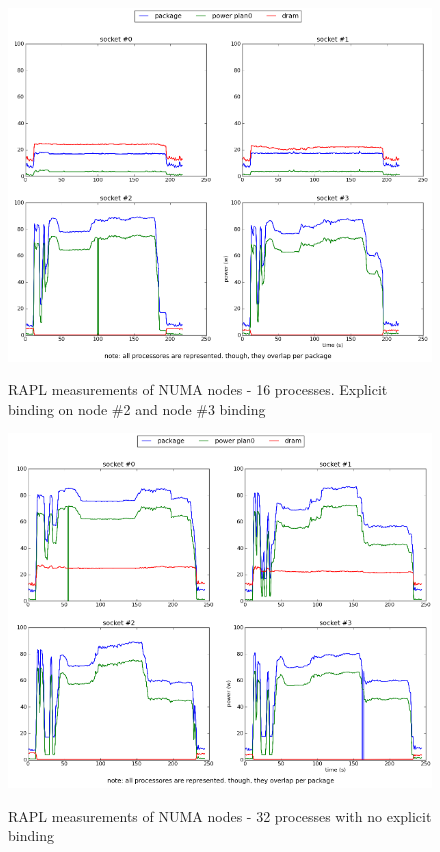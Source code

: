 \begin{figure}[h!]
  \centering
    \includegraphics[width=150mm]{"img/numa/16proc_node2and3"}
    \label{fig:nf_ss}
    \caption{RAPL measurements of NUMA nodes - 16 processes. Explicit binding
on node \#2 and node \#3 binding}
\end{figure}


\begin{figure}[h!]
  \centering
    \includegraphics[width=150mm]{"img/numa/32proc"}
    \label{fig:nf_ss}
    \caption{RAPL measurements of NUMA nodes - 32 processes with no explicit
binding}
\end{figure}


